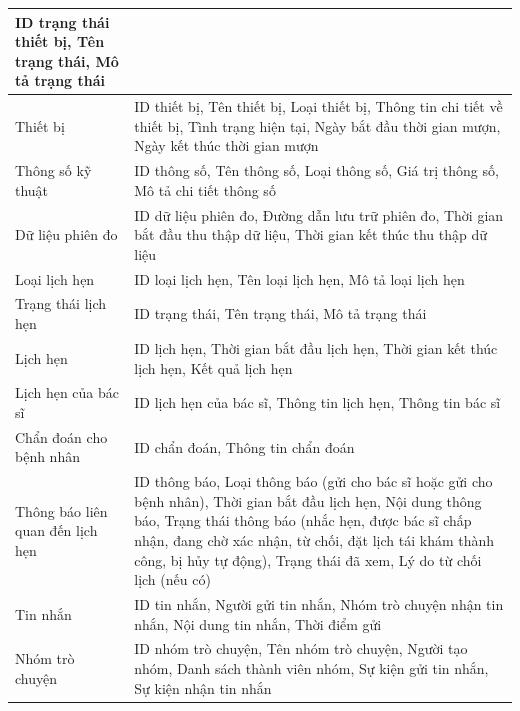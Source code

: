\begin{table}[H]
\begin{tabularx}{\textwidth}{|p{4.5cm}|X|}
		ID trạng thái thiết bị, Tên trạng thái, Mô tả trạng thái                                                                                                    \\
		\hline
		Thiết bị                         &
		ID thiết bị, Tên thiết bị, Loại thiết bị, Thông tin chi tiết về thiết bị, Tình trạng hiện tại, Ngày bắt đầu thời gian mượn, Ngày kết thúc thời gian mượn    \\
		\hline
		Thông số kỹ thuật                &
		ID thông số, Tên thông số, Loại thông số, Giá trị thông số, Mô tả chi tiết thông số                                                                         \\
		\hline
		Dữ liệu phiên đo                 &
		ID dữ liệu phiên đo, Đường dẫn lưu trữ phiên đo, Thời gian bắt đầu thu thập dữ liệu, Thời gian kết thúc thu thập dữ liệu                                    \\
		\hline
		Loại lịch hẹn                    &
		ID loại lịch hẹn, Tên loại lịch hẹn, Mô tả loại lịch hẹn                                                                                                    \\
		\hline
		Trạng thái lịch hẹn              &
		ID trạng thái, Tên trạng thái, Mô tả trạng thái                                                                                                             \\
		\hline
		Lịch hẹn                         &
		ID lịch hẹn, Thời gian bắt đầu lịch hẹn, Thời gian kết thúc lịch hẹn, Kết quả lịch hẹn                                                                      \\
		\hline
		Lịch hẹn của bác sĩ              &
		ID lịch hẹn của bác sĩ, Thông tin lịch hẹn, Thông tin bác sĩ                                                                                                \\
		\hline
		Chẩn đoán cho bệnh nhân          &
		ID chẩn đoán, Thông tin chẩn đoán                                                                                                                           \\
		\hline
		Thông báo liên quan đến lịch hẹn &
		ID thông báo, Loại thông báo (gửi cho bác sĩ hoặc gửi cho bệnh nhân), Thời gian bắt đầu lịch hẹn, Nội dung thông báo,
		Trạng thái thông báo (nhắc hẹn, được bác sĩ chấp nhận, đang chờ xác nhận, từ chối, đặt lịch tái khám thành công, bị hủy tự động),
		Trạng thái đã xem, Lý do từ chối lịch (nếu có)                                                                                                              \\
		\hline
		Tin nhắn                         &
		ID tin nhắn, Người gửi tin nhắn, Nhóm trò chuyện nhận tin nhắn, Nội dung tin nhắn, Thời điểm gửi                                                            \\
		\hline
		Nhóm trò chuyện                  &
		ID nhóm trò chuyện, Tên nhóm trò chuyện, Người tạo nhóm, Danh sách thành viên nhóm, Sự kiện gửi tin nhắn, Sự kiện nhận tin nhắn                             \\
		\hline
	\end{tabularx}
\end{table}


